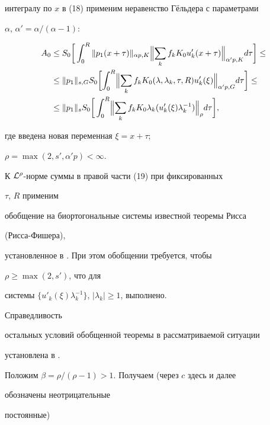 {интегралу по $x$ в (18) применим неравенство Г\"ельдера с параметрами


$\alpha$, $\alpha'=\alpha/(\alpha-1)$:


\begin{align}


A_0&\le S_0\biggl[\,\int^R_0\|p_1(x+\tau)\|_{\alpha p,K}


\Bigl\|\sum_k f_k K_0 u'_k(x+\tau)\Bigr\|_{\alpha'p,K}d\tau


\biggr]\le \notag\\


&\le \|p_1\|_{s,G}S_0\biggl[\int^R_0\Bigl\|\sum_k f_k K_0


(\lambda,\lambda_k,\tau,R)u'_k(\xi)


\Bigr\|_{\alpha'p,G}d\tau\biggr]\le\notag \\


&\le \|p_1\|_s S_0\biggl[\,\int^R_0\Bigl\|\sum_k f_k K_0


\lambda_k(u'_k(\xi)\lambda^{-1}_k)\Bigr\|_\rho d\tau\biggr],


\end{align}


где введена новая переменная $\xi=x+\tau$;


$\rho=\max(2,s',\alpha'p)<\infty$.





К $\cal L^\rho$-норме суммы в правой части (19) при фиксированных


$\tau$, $R$ применим


обобщение на биортогональные системы известной теоремы Рисса


(Рисса-Фишера),


установленное в \cite{12}. При этом обобщении требуется, чтобы


$\rho\ge\max(2,s')$, что для


системы $\{u'_k(\xi)\lambda^{-1}_k\}$, $|\lambda_k|\ge 1$, выполнено.


Справедливость


остальных условий обобщенной теоремы в рассматриваемой ситуации


установлена в \cite{12}.


Положим $\beta=\rho/(\rho-1)>1$. Получаем (через $c$ здесь и далее


обозначены неотрицательные


постоянные)


\begin{multline}



\end{multline}}
